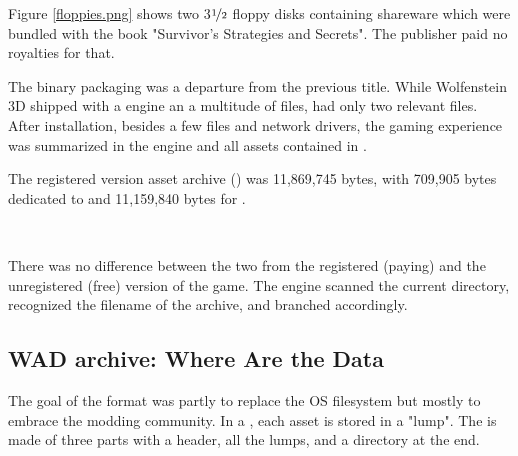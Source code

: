 \par
Figure \ref{floppies.png} shows two 3$\nicefrac{1}{2}$ floppy disks containing \doom{} shareware which were bundled with the book "Survivor's Strategies and Secrets". The publisher paid no royalties for that.\\
\par
The binary packaging was a departure from the previous title. While Wolfenstein 3D shipped with a  engine an a multitude of  files, \doom{} had only two relevant files. After installation, besides a few  files and network drivers, the gaming experience was summarized in the engine  and all assets contained in .\\
\vspace{3mm}

\vspace{2mm}
The registered version asset archive () was 11,869,745 bytes, with 709,905 bytes dedicated to  and 11,159,840 bytes for .
\pagebreak

\\
\par
There was no difference between the two  from the registered (paying) and the unregistered (free) version of the game. The engine scanned the current directory, recognized the filename of the  archive, and branched accordingly.\\
\par
{}
%  




\subsection{WAD archive: Where Are the Data}
\label{wad_explained}
The goal of the  format was partly to replace the OS filesystem but mostly to embrace the modding community. In a , each asset is stored in a "lump". The  is made of three parts with a header, all the lumps, and a directory at the end.\\

